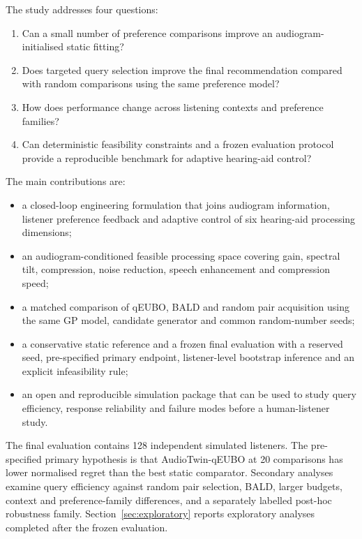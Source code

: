\documentclass[preprint,12pt]{elsarticle}
\begin{document}
The study addresses four questions:
\begin{enumerate}[label=(Q\arabic*)]
    \item Can a small number of preference comparisons improve an audiogram-initialised static fitting?
    \item Does targeted query selection improve the final recommendation compared with random comparisons using the same preference model?
    \item How does performance change across listening contexts and preference families?
    \item Can deterministic feasibility constraints and a frozen evaluation protocol provide a reproducible benchmark for adaptive hearing-aid control?
\end{enumerate}

The main contributions are:
\begin{itemize}
    \item a closed-loop engineering formulation that joins audiogram information, listener preference feedback and adaptive control of six hearing-aid processing dimensions;
    \item an audiogram-conditioned feasible processing space covering gain, spectral tilt, compression, noise reduction, speech enhancement and compression speed;
    \item a matched comparison of qEUBO, BALD and random pair acquisition using the same GP model, candidate generator and common random-number seeds;
    \item a conservative static reference and a frozen final evaluation with a reserved seed, pre-specified primary endpoint, listener-level bootstrap inference and an explicit infeasibility rule;
    \item an open and reproducible simulation package that can be used to study query efficiency, response reliability and failure modes before a human-listener study.
\end{itemize}

The final evaluation contains 128 independent simulated listeners. The pre-specified primary hypothesis is that AudioTwin-qEUBO at 20 comparisons has lower normalised regret than the best static comparator. Secondary analyses examine query efficiency against random pair selection, BALD, larger budgets, context and preference-family differences, and a separately labelled post-hoc robustness family. Section~\ref{sec:exploratory} reports exploratory analyses completed after the frozen evaluation.
\end{document}
